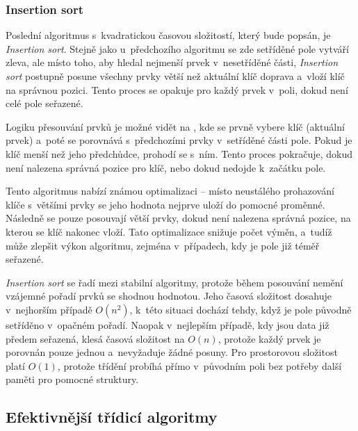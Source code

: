 \subsubsection*{Insertion sort}

Poslední algoritmus s~kvadratickou časovou složitostí, který bude popsán, je \textit{Insertion sort}.
Stejně jako u~předchozího algoritmu se zde setříděné pole vytváří zleva, ale místo toho, aby hledal nejmenší prvek v~nesetříděné části, \textit{Insertion sort} postupně posune všechny prvky větší než aktuální klíč doprava a~vloží klíč na správnou pozici.
Tento proces se opakuje pro každý prvek v~poli, dokud není celé pole seřazené.~\cite{morin2013}

Logiku přesouvání prvků je možné vidět na , kde se prvně vybere klíč (aktuální prvek) a~poté se porovnává s~předchozími prvky v~setříděné části pole.
Pokud je klíč menší než jeho předchůdce, prohodí se s~ním.
Tento proces pokračuje, dokud není nalezena správná pozice pro klíč, nebo dokud nedojde k~začátku pole.

\begin{listing}[ht]
    
    \caption{Pseudokód algoritmu Insertion sort}
    \label{lst:insertionSort}
\end{listing}

Tento algoritmus nabízí známou optimalizaci -- místo neustálého prohazování klíče s~většími prvky se jeho hodnota nejprve uloží do pomocné proměnné.
Následně se pouze posouvají větší prvky, dokud není nalezena správná pozice, na kterou se klíč nakonec vloží.
Tato optimalizace snižuje počet výměn, a~tudíž může zlepšit výkon algoritmu, zejména v~případech, kdy je pole již téměř seřazené.

\textit{Insertion sort} se řadí mezi stabilní algoritmy, protože během posouvání nemění vzájemné pořadí prvků se shodnou hodnotou.
Jeho časová složitost dosahuje v~nejhorším případě $O(n^2)$, k~této situaci dochází tehdy, když je pole původně setříděno v~opačném pořadí.
Naopak v~nejlepším případě, kdy jsou data již předem seřazená, klesá časová složitost na $O(n)$, protože každý prvek je porovnán pouze jednou a~nevyžaduje žádné posuny.
Pro prostorovou složitost platí $O(1)$, protože třídění probíhá přímo v~původním poli bez potřeby další paměti pro pomocné struktury.~\cite{morin2013}

\subsection{Efektivnější třídicí algoritmy}
\label{subsec:logarithmic_algorithms}

